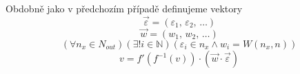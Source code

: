 \documentclass[12pt]{report}			%
\newcommand{\N}{\mathbb{N}}   			%
\begin{document}
				Obdobně jako v předchozím případě definujeme vektory
				\begin{equation} \vec{\varepsilon} = (\varepsilon_{1},\,\varepsilon_{2},\,\ldots) \end{equation}
				\begin{equation} \vec{w} = (w_{1},\,w_{2},\,\ldots) \end{equation}
				\begin{equation} \left(\forall n_x \in N_{out}\right)\left(\exists! i \in \N\right)\left(\varepsilon_i \in n_x \land w_i = W(n_x, n)\right) \end{equation}
				\begin{equation} v = f'\left(f^{-1}(v)\right)\cdot \left(\vec{w} \cdot \vec{\varepsilon}\right) \end{equation}
				
\end{document}
